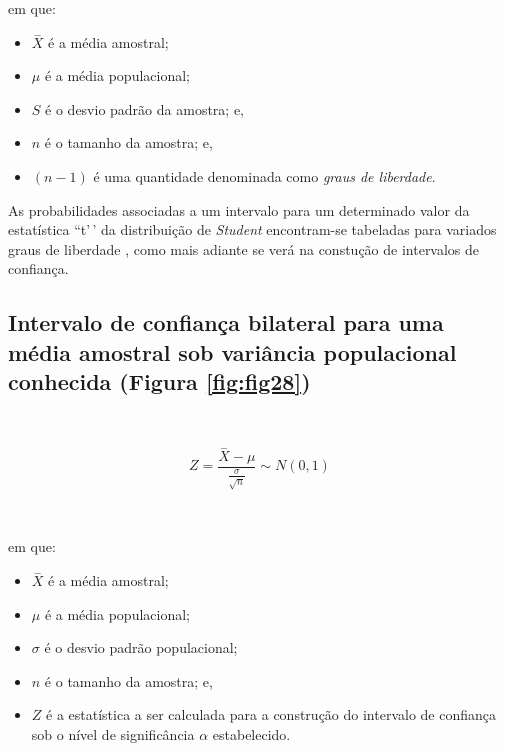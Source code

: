 \documentclass[
]{book}
\providecommand{\tightlist}{%
  \setlength{\itemsep}{0pt}\setlength{\parskip}{0pt}}
\begin{document}
em que:

\hfill\break

\begin{itemize}
\tightlist
\item
  \(\stackrel{-}{X}\) é a média amostral;\\
\item
  \(\mu\) é a média populacional;
\item
  \(S\) é o desvio padrão da amostra; e,\\
\item
  \(n\) é o tamanho da amostra; e,\\
\item
  \((n-1)\) é uma quantidade denominada como \emph{graus de liberdade}.
\end{itemize}

\hfill\break

As probabilidades associadas a um intervalo para um determinado valor da estatística ``t'\,' da distribuição de \emph{Student} encontram-se tabeladas para variados graus de liberdade , como mais adiante se verá na constução de intervalos de confiança.

\hfill\break

\hypertarget{intervalo-de-confianuxe7a-bilateral-para-uma-muxe9dia-amostral-sob-variuxe2ncia-populacional-conhecida-figura-reffigfig28}{%
\subsection{Intervalo de confiança bilateral para uma média amostral sob variância populacional conhecida (Figura \ref{fig:fig28})}\label{intervalo-de-confianuxe7a-bilateral-para-uma-muxe9dia-amostral-sob-variuxe2ncia-populacional-conhecida-figura-reffigfig28}}

~

\[
Z = \frac{\stackrel{-}{X} - \mu}{\frac{\sigma}{\sqrt{n}}}  \sim N(0 ,1)
\]

~

em que:

\hfill\break

\begin{itemize}
\tightlist
\item
  \(\stackrel{-}{X}\) é a média amostral;\\
\item
  \(\mu\) é a média populacional;\\
\item
  \(\sigma\) é o desvio padrão populacional;
\item
  \(n\) é o tamanho da amostra; e,
\item
  \(Z\) é a estatística a ser calculada para a construção do intervalo de confiança sob o nível de significância \(\alpha\) estabelecido.
\end{itemize}
\end{document}
